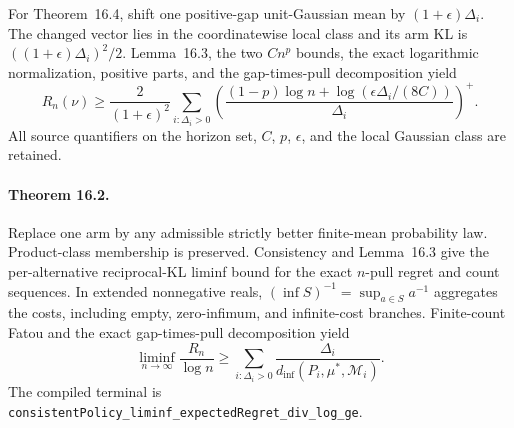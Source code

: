 For Theorem~16.4, shift one positive-gap unit-Gaussian mean by
$(1+\epsilon)\Delta_i$. The changed vector lies in the coordinatewise local
class and its arm KL is $((1+\epsilon)\Delta_i)^2/2$. Lemma~16.3, the two
$Cn^p$ bounds, the exact logarithmic normalization, positive parts, and the
gap-times-pull decomposition yield
\[
 R_n(\nu) \ge \frac{2}{(1+\epsilon)^2}
 \sum_{i:\Delta_i>0}
 \left(\frac{(1-p)\log n+\log(\epsilon\Delta_i/(8C))}{\Delta_i}\right)^+.
\]
All source quantifiers on the horizon set, $C$, $p$, $\epsilon$, and the local
Gaussian class are retained.

\paragraph{Theorem 16.2.}
Replace one arm by any admissible strictly better finite-mean probability
law. Product-class membership is preserved. Consistency and Lemma~16.3
give the per-alternative reciprocal-KL liminf bound for the exact $n$-pull
regret and count sequences. In extended nonnegative reals,
$(\inf S)^{-1}=\sup_{a\in S}a^{-1}$ aggregates the costs, including empty,
zero-infimum, and infinite-cost branches. Finite-count Fatou and the exact
gap-times-pull decomposition yield
\[
 \liminf_{n\to\infty}\frac{R_n}{\log n}
 \ge \sum_{i:\Delta_i>0}\frac{\Delta_i}{d_{\inf}(P_i,\mu^*,\mathcal M_i)}.
\]
The compiled terminal is
\texttt{consistentPolicy\_liminf\_expectedRegret\_div\_log\_ge}.
